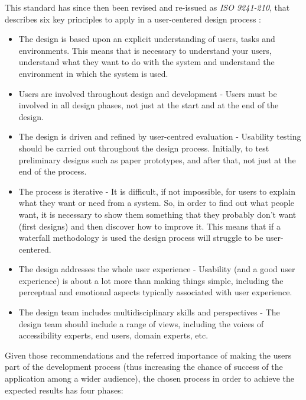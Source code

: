 This standard has since then been revised and re-issued as \emph{ISO 9241-210}, that describes six key principles to apply in a user-centered design process \cite{kn:Tra11}:

\begin{itemize}
\item The design is based upon an explicit understanding of users, tasks and environments. This means that is necessary to understand your users, understand what they want to do with the system and understand the environment in which the system is used.

\item Users are involved throughout design and development - Users must be involved in all design phases, not just at the start and at the end of the design.

\item The design is driven and refined by user-centred evaluation - Usability testing should be carried out throughout the design process. Initially, to test preliminary designs such as paper prototypes, and after that, not just at the end of the process.

\item The process is iterative - It is difficult, if not impossible, for users to explain what they want or need from a system. So, in order to find out what people want, it is necessary to show them something that they probably don't want (first designs) and then discover how to improve it. This means that if a waterfall methodology is used the design process will struggle to be user-centered.

\item The design addresses the whole user experience - Usability (and a good user experience) is about a lot more than making things simple, including the perceptual and emotional aspects typically associated with user experience.

\item The design team includes multidisciplinary skills and perspectives - The design team should include a range of views, including the voices of accessibility experts, end users, domain experts, etc.
\end{itemize}



Given those recommendations and the referred importance of making the users part of the development process (thus increasing the chance of success of the application among a wider audience), the chosen process in order to achieve the expected results has four phases: 

